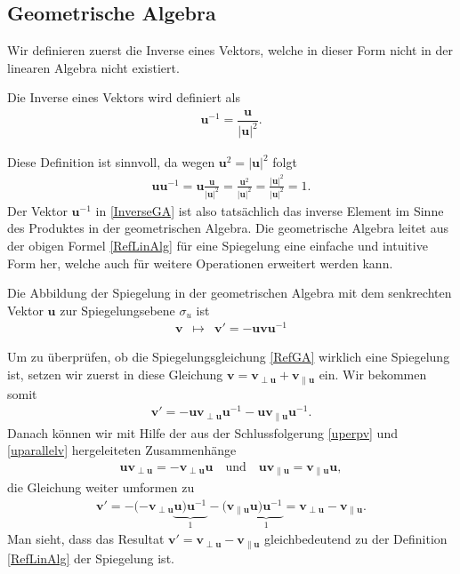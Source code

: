 \subsection{Geometrische Algebra}
Wir definieren zuerst die Inverse eines Vektors, welche in dieser Form nicht in der linearen Algebra nicht existiert.
\begin{definition}
	Die Inverse eines Vektors wird definiert als
	\begin{align} \label{InverseGA}
	\mathbf{u}^{-1} = \dfrac{\mathbf{u}}{|\mathbf{u}|^2}. 
	\end{align}
\end{definition}
Diese Definition ist sinnvoll, da wegen $\mathbf{u}^2 = |\mathbf{u}|^2$ folgt
\begin{align}
\mathbf{uu}^{-1} = \mathbf{u} \frac{\mathbf{u}}{|\mathbf{u}|^2} = \frac{\mathbf{u}^2}{|\mathbf{u}|^2} = \frac{|\mathbf{u}|^2}{|\mathbf{u}|^2} = 1.
\end{align}
Der Vektor $\mathbf{u}^{-1}$ in \eqref{InverseGA} ist also tatsächlich das inverse Element im Sinne des Produktes in der geometrischen Algebra.
Die geometrische Algebra leitet aus der obigen Formel \eqref{RefLinAlg} für eine Spiegelung eine einfache und intuitive Form her, welche auch für weitere Operationen erweitert werden kann.
\begin{definition}
	Die Abbildung der Spiegelung in der geometrischen Algebra mit dem senkrechten Vektor $\mathbf{u}$ zur Spiegelungsebene $\sigma_u$ ist 
	\begin{align}\label{RefGA}
	\mathbf{v} \enspace\mapsto\enspace \mathbf{v}' = -\mathbf{uvu}^{-1}
	\end{align}
\end{definition}
Um zu überprüfen, ob die Spiegelungsgleichung \eqref{RefGA} wirklich eine Spiegelung ist, setzen wir zuerst in diese Gleichung $\mathbf{v} = \mathbf{v_{\perp u}} + \mathbf{v_{\parallel u}}$ ein. Wir bekommen somit
\begin{align}
\mathbf{v}' = -\mathbf{uv_{\perp u}u}^{-1} - \mathbf{uv_{\parallel u}u}^{-1}.
\end{align}
Danach können wir mit Hilfe der aus der Schlussfolgerung \eqref{uperpv} und \eqref{uparallelv} hergeleiteten Zusammenhänge
\begin{align}
\mathbf{uv_{\perp u}} = -\mathbf{v_{\perp u}u} \quad\text{und}\quad \mathbf{uv_{\parallel u}}=\mathbf{v_{\parallel u}u},
\end{align}
die Gleichung weiter umformen zu
\begin{align}
\mathbf{v}' = -(-\mathbf{v_{\perp u}}\underbrace{\mathbf{u})\mathbf{u}^{-1}}_{1} -(\mathbf{v_{\parallel u}}\underbrace{\mathbf{u})\mathbf{u}^{-1}}_{1} = \mathbf{v_{\perp u}} - \mathbf{v_{\parallel u}}.
\end{align}
Man sieht, dass das Resultat $\mathbf{v}' = \mathbf{v_{\perp u}} - \mathbf{v_{\parallel u}}$
gleichbedeutend zu der Definition \eqref{RefLinAlg} der Spiegelung ist.

